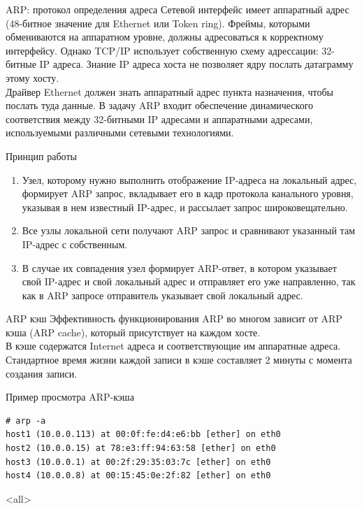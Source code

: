 \begin{frame}{ARP: протокол определения адреса}
	Сетевой интерфейс имеет аппаратный адрес (48-битное значение для Ethernet или Token ring). 
Фреймы,  которыми обмениваются на аппаратном уровне,  должны адресоваться к корректному интерфейсу. 
Однако TCP/IP использует собственную схему адрессации: 32-битные IP адреса. 
Знание IP адреса хоста не позволяет ядру послать датаграмму этому хосту.\\
Драйвер Ethernet должен знать аппаратный адрес пункта назначения,  чтобы послать туда данные. В задачу ARP входит обеспечение динамического соответствия между 32-битными IP адресами и аппаратными адресами,  используемыми различными сетевыми технологиями.
\end{frame}

\begin{frame}{Принцип работы}
	\begin{enumerate}
		\item Узел,  которому нужно выполнить отображение IP-адреса на локальный адрес,  формирует ARP запрос,  вкладывает его в кадр протокола канального уровня,  указывая в нем известный IP-адрес,  и рассылает запрос широковещательно.
		\item Все узлы локальной сети получают ARP запрос и сравнивают указанный там IP-адрес с собственным.
		\item В случае их совпадения узел формирует ARP-ответ,  в котором указывает свой IP-адрес и свой локальный адрес и отправляет его уже направленно,  так как в ARP запросе отправитель указывает свой локальный адрес.
	\end{enumerate}
\end{frame}

\begin{frame}{ARP кэш}
	Эффективность функционирования ARP во многом зависит от ARP кэша (ARP cache),  который присутствует на каждом хосте.\\
	В кэше содержатся Internet адреса и соответствующие им аппаратные адреса.\\
	Стандартное время жизни каждой записи в кэше составляет 2 минуты с момента создания записи.
\end{frame}

\begin{frame}[fragile]{Пример просмотра ARP-кэша}
\scriptsize
	\begin{verbatim}
# arp -a
host1 (10.0.0.113) at 00:0f:fe:d4:e6:bb [ether] on eth0
host2 (10.0.0.15) at 78:e3:ff:94:63:58 [ether] on eth0
host3 (10.0.0.1) at 00:2f:29:35:03:7c [ether] on eth0
host4 (10.0.0.8) at 00:15:45:0e:2f:82 [ether] on eth0
	\end{verbatim}
\normalsize
\end{frame}

\mode<all>{}


